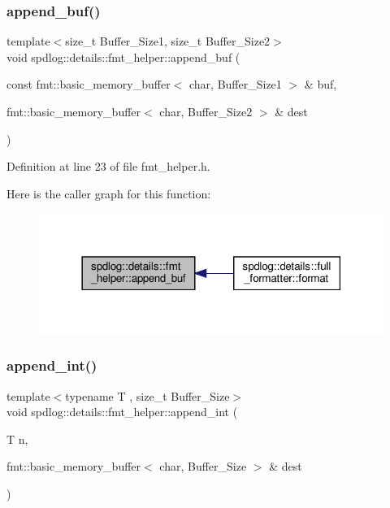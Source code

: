 \subsubsection{\texorpdfstring{append\+\_\+buf()}{append\_buf()}}
{\footnotesize\ttfamily template$<$size\+\_\+t Buffer\+\_\+\+Size1, size\+\_\+t Buffer\+\_\+\+Size2$>$ \\
void spdlog\+::details\+::fmt\+\_\+helper\+::append\+\_\+buf (\begin{DoxyParamCaption}\item[{const fmt\+::basic\+\_\+memory\+\_\+buffer$<$ char, Buffer\+\_\+\+Size1 $>$ \&}]{buf,  }\item[{fmt\+::basic\+\_\+memory\+\_\+buffer$<$ char, Buffer\+\_\+\+Size2 $>$ \&}]{dest }\end{DoxyParamCaption})\hspace{0.3cm}{\ttfamily [inline]}}



Definition at line 23 of file fmt\+\_\+helper.\+h.

Here is the caller graph for this function\+:
\nopagebreak
\begin{figure}[H]
\begin{center}
\leavevmode
\includegraphics[width=318pt]{namespacespdlog_1_1details_1_1fmt__helper_a1cd64e7ba833d726c77344aa9fb85e6a_icgraph}
\end{center}
\end{figure}
\mbox{\label{namespacespdlog_1_1details_1_1fmt__helper_a0d2621043fa718e54ffcaa2e9812dfa4}} 
\subsubsection{\texorpdfstring{append\+\_\+int()}{append\_int()}}
{\footnotesize\ttfamily template$<$typename T , size\+\_\+t Buffer\+\_\+\+Size$>$ \\
void spdlog\+::details\+::fmt\+\_\+helper\+::append\+\_\+int (\begin{DoxyParamCaption}\item[{T}]{n,  }\item[{fmt\+::basic\+\_\+memory\+\_\+buffer$<$ char, Buffer\+\_\+\+Size $>$ \&}]{dest }\end{DoxyParamCaption})\hspace{0.3cm}{\ttfamily [inline]}}



